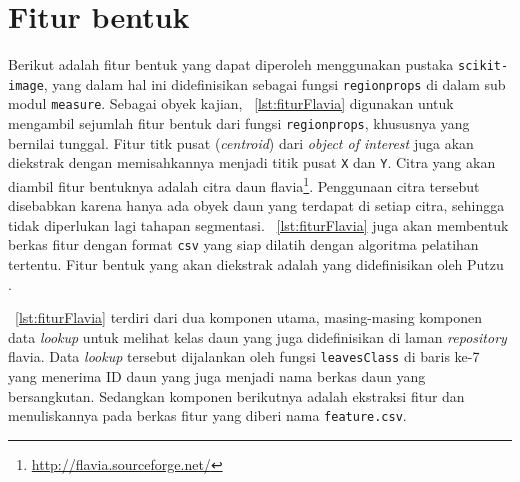  \section{Fitur bentuk}
Berikut adalah fitur bentuk yang dapat diperoleh menggunakan pustaka \texttt{scikit-image}, yang dalam hal ini didefinisikan sebagai fungsi \texttt{regionprops} di dalam sub modul \texttt{measure}. Sebagai obyek kajian, \lstlistingname~\ref{lst:fiturFlavia} digunakan untuk mengambil sejumlah fitur bentuk dari fungsi \texttt{regionprops}, khususnya yang bernilai tunggal. Fitur titk pusat (\textit{centroid}) dari \textit{object of interest} juga akan diekstrak dengan memisahkannya menjadi titik pusat \texttt{X} dan \texttt{Y}. Citra yang akan diambil fitur bentuknya adalah citra daun flavia\footnote{\url{http://flavia.sourceforge.net/}}. Penggunaan citra tersebut disebabkan karena hanya ada obyek daun yang terdapat di setiap citra, sehingga tidak diperlukan lagi tahapan segmentasi. \lstlistingname~\ref{lst:fiturFlavia} juga akan membentuk berkas fitur dengan format \texttt{csv} yang siap dilatih dengan algoritma pelatihan tertentu. Fitur bentuk yang akan diekstrak adalah yang didefinisikan oleh Putzu \cite{PUTZU2014179}.

\lstlistingname~\ref{lst:fiturFlavia} terdiri dari dua komponen utama, masing-masing komponen data \textit{lookup} untuk melihat kelas daun yang juga didefinisikan di laman \textit{repository} flavia. Data \textit{lookup} tersebut dijalankan oleh fungsi \texttt{leavesClass} di baris ke-7 yang menerima ID daun yang juga menjadi nama berkas daun yang bersangkutan. Sedangkan komponen berikutnya adalah ekstraksi fitur dan menuliskannya pada berkas fitur yang diberi nama \texttt{feature.csv}. 

\scriptsize

\normalsize
